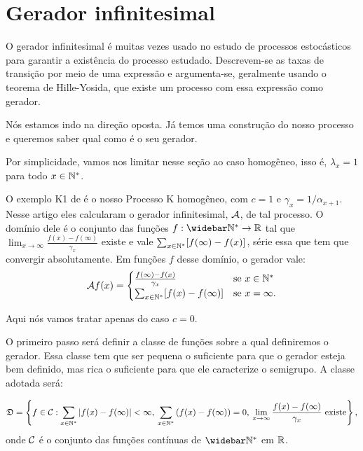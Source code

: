 
\section{Gerador infinitesimal}
\label{sec:gerador}


O gerador infinitesimal é muitas vezes usado no estudo de processos
estocásticos para garantir a existência do processo
estudado. Descrevem-se as taxas de transição por meio de uma expressão
e argumenta-se, geralmente usando o teorema de Hille-Yosida, que
existe um processo com essa expressão como gerador.

Nós estamos indo na direção oposta. Já temos uma construção do nosso
processo e queremos saber qual como é o seu gerador.

Por simplicidade, vamos nos limitar nesse seção ao caso homogêneo,
isso é, $\lambda_x = 1$ para todo $x \in {\mathbb{N^*}}$.

O exemplo K1 de \cite{kendall:56} é o nosso Processo K homogêneo, com
$c = 1$ e $\gamma_x = 1/\alpha_{x+1}$. Nesse artigo eles calcularam o
gerador infinitesimal, ${\mathcal{A}}$, de tal processo. O domínio dele é o
conjunto das funções $f: \Nzb \to \R$ tal que $\lim_{x \to \infty} \frac{f(x)
  - f(\infty)}{\gamma_x}$ existe e vale $\sum_{x
  \in {\mathbb{N^*}}} [f(\infty) - f(x)]$, série essa que tem que convergir
absolutamente. Em funções $f$ desse domínio, o gerador vale:
\begin{align*}
  {\mathcal{A}} f (x) = \begin{cases}
    \frac{f(\infty) - f(x)}{\gamma_x} & \text{se } x \in {\mathbb{N^*}}\\
    \sum_{x\in {\mathbb{N^*}}} [f(x) - f(\infty)] & \text{se } x = \infty.
  \end{cases}
\end{align*}

Aqui nós vamos tratar apenas do caso $c = 0$.

O primeiro passo será definir a classe de funções sobre a qual
definiremos o gerador. Essa classe tem que ser pequena o suficiente
para que o gerador esteja bem definido, mas rica o suficiente para que
ele caracterize o semigrupo. A classe adotada será:

\begin{equation}
  \label{eq:classe-gerador}
  {\mathfrak{D}} = \left\{ f \in {\mathcal{C}}: \sum_{x\in {\mathbb{N^*}}} |f(x)-f(\infty)| < \infty,
    \:
    \sum_{x\in {\mathbb{N^*}}} \left( f(x)-f(\infty)\right) = 0, \:
    \lim_{x \to \infty} \frac{f(x) - f(\infty)}{\gamma_x} \textrm{ existe}
  \right\},
\end{equation}
onde ${\mathcal{C}}$ é o conjunto das funções contínuas de $\Nzb$ em ${\mathbb{R}}$.

